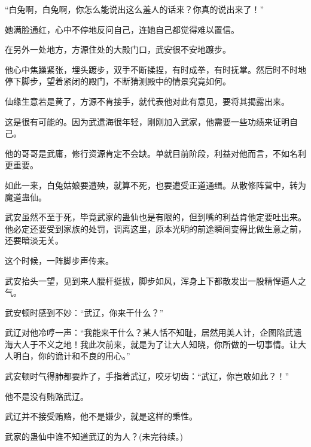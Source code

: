 \begin{this_body}
“白兔啊，白兔啊，你怎么能说出这么羞人的话来？你真的说出来了！”

她满脸通红，心中不停地反问自己，连她自己都觉得难以置信。

在另外一处地方，方源住处的大殿门口，武安很不安地踱步。

他心中焦躁紧张，埋头踱步，双手不断揉捏，有时成拳，有时抚掌。然后时不时地停下脚步，望着紧闭的殿门，不断猜测殿中的情景究竟如何。

仙缘生意若是黄了，方源不肯接手，就代表他对此有意见，要将其揭露出来。

这是很有可能的。因为武遗海很年轻，刚刚加入武家，他需要一些功绩来证明自己。

他的哥哥是武庸，修行资源肯定不会缺。单就目前阶段，利益对他而言，不如名利更重要。

如此一来，白兔姑娘要遭殃，就算不死，也要遭受正道通缉。从散修阵营中，转为魔道蛊仙。

武安虽然不至于死，毕竟武家的蛊仙也是有限的，但到嘴的利益肯他定要吐出来。他必定还要受到家族的处罚，调离这里，原本光明的前途瞬间变得比做生意之前，还要暗淡无关。

这个时候，一阵脚步声传来。

武安抬头一望，见到来人腰杆挺拔，脚步如风，浑身上下都散发出一股精悍逼人之气。

武安顿时感到不妙：“武辽，你来干什么？”

武辽对他冷哼一声：“我能来干什么？某人恬不知耻，居然用美人计，企图陷武遗海大人于不义之地！我此次前来，就是为了让大人知晓，你所做的一切事情。让大人明白，你的诡计和不良的用心。”

武安顿时气得肺都要炸了，手指着武辽，咬牙切齿：“武辽，你岂敢如此？！”

他不是没有贿赂武辽。

武辽并不接受贿赂，他不是嫌少，就是这样的秉性。

武家的蛊仙中谁不知道武辽的为人？(未完待续。)

\end{this_body}

